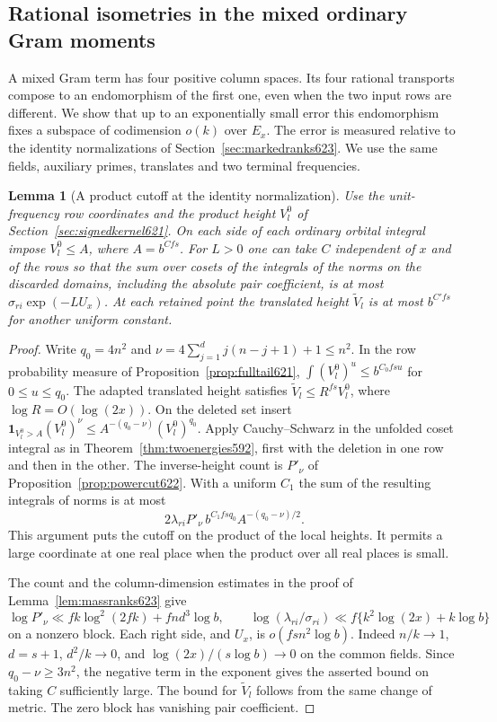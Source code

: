 \documentclass[a4paper,11pt]{article}
\newtheorem{lemma}[proposition]{Lemma}
\theoremstyle{definition}
\theoremstyle{remark}
\numberwithin{equation}{section}
\begin{document}
\subsection{Rational isometries in the mixed ordinary Gram moments}
\label{sec:rationalgram629}

A mixed Gram term has four positive column spaces. Its four rational
transports compose to an endomorphism of the first one, even when the
two input rows are different. We show that up to an exponentially
small error this endomorphism fixes a subspace of codimension \(o(k)\)
over \(E_x\). The error is measured relative to the identity
normalizations of Section~\ref{sec:markedranks623}. We use the same
fields, auxiliary primes, translates and two terminal frequencies.

\begin{lemma}[A product cutoff at the identity normalization]
\leavevmode\label{lem:productcut629}
Use the unit-frequency row coordinates and the product height \(V_l^0\)
of Section~\ref{sec:signedkernel621}. On each side of each ordinary
orbital integral impose \(V_l^0\le A\), where \(A=b^{Cfs}\).
For \(L>0\) one can take \(C\) independent of \(x\) and of the rows
so that the sum over cosets of the integrals of the norms on the
discarded domains, including the absolute pair coefficient, is
at most \(\sigma_{ri}\exp(-LU_x)\).
At each retained point the translated height \(\widetilde V_l\)
is at most \(b^{C'fs}\) for another uniform constant.
\end{lemma}
\begin{proof}
Write \(q_0=4n^2\) and
\(\nu=4\sum_{j=1}^d j(n-j+1)+1\le n^2\). In the row probability
measure of Proposition~\ref{prop:fulltail621},
\(\int(V_l^0)^u\le b^{C_0fsu}\) for \(0\le u\le q_0\).
The adapted translated height satisfies
\(\widetilde V_l\le R^{fs}V_l^0\), where \(\log R=O(\log(2x))\).
On the deleted set insert
\(\mathbf1_{V_l^0>A}(V_l^0)^\nu
 \le A^{-(q_0-\nu)}(V_l^0)^{q_0}\).
Apply Cauchy--Schwarz in the unfolded coset integral as in
Theorem~\ref{thm:twoenergies592}, first with the deletion in one row
and then in the other. The inverse-height count is \(P'_\nu\)
of Proposition~\ref{prop:powercut622}. With a uniform \(C_1\) the
sum of the resulting integrals of norms is at most
\[
       2\lambda_{ri} P'_\nu\, b^{C_1fsq_0}
                              A^{-(q_0-\nu)/2}.
\]
This argument puts the cutoff on the product of the local heights.
It permits a large coordinate at one real place when the product
over all real places is small.

The count and the column-dimension estimates in the proof of
Lemma~\ref{lem:massranks623} give
\[
 \log P'_\nu\ll fk\log^2(2fk)+fnd^3\log b,\qquad
 \log(\lambda_{ri}/\sigma_{ri})
       \ll f\{k^2\log(2x)+k\log b\}
\]
on a nonzero block. Each right side, and \(U_x\), is
\(o(fs n^2\log b)\). Indeed \(n/k\to1\), \(d=s+1\),
\(d^2/k\to0\), and \(\log(2x)/(s\log b)\to0\) on the common
fields. Since \(q_0-\nu\ge3n^2\), the negative term in the
exponent gives the asserted bound on taking \(C\) sufficiently
large. The bound for \(\widetilde V_l\) follows from the same
change of metric. The zero block has vanishing pair coefficient.
\end{proof}
\end{document}
